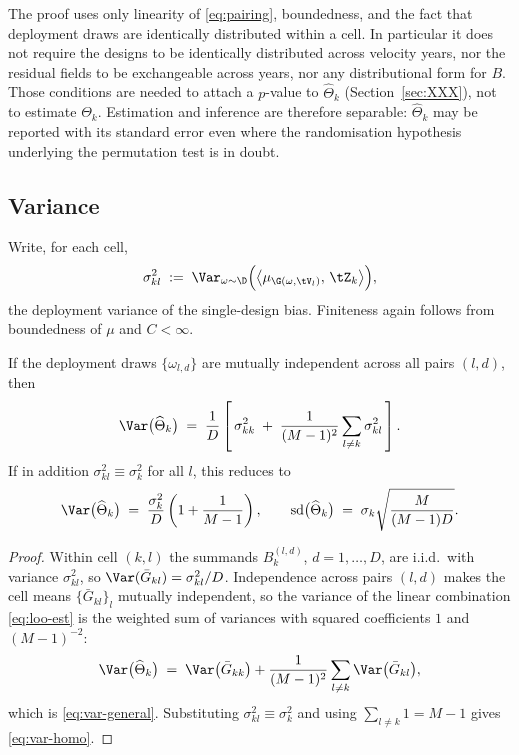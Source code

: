 \begin{remark}
\label{rem:noassumption}
The proof uses only linearity of \eqref{eq:pairing}, boundedness, and the fact that deployment
draws are identically distributed within a cell. In particular it does not require the designs to
be identically distributed across velocity years, nor the residual fields to be exchangeable across
years, nor any distributional form for $B$. Those conditions are needed to attach a $p$-value to
$\widehat{\Theta}_k$ (Section~\ref{sec:XXX}), not to estimate $\Theta_k$. Estimation and inference
are therefore separable: $\widehat{\Theta}_k$ may be reported with its standard error even where
the randomisation hypothesis underlying the permutation test is in doubt.
\end{remark}

\subsection{Variance}
\label{sec:loo-var}

Write, for each cell,
\begin{equation}
  \sigma^2_{kl} \;:=\; \Var_{\omega\sim\D}\Big(\big\langle \mu_{\G(\omega,\tV_l)},\, \tZ_k\big\rangle\Big) ,
\end{equation}
the deployment variance of the single-design bias. Finiteness again follows from boundedness of
$\mu$ and $C < \infty$.

\begin{proposition}
\label{prop:var}
If the deployment draws $\{\omega_{l,d}\}$ are mutually independent across all pairs $(l,d)$, then
\begin{equation}
  \label{eq:var-general}
  \Var\big(\widehat{\Theta}_k\big)
  \;=\; \frac{1}{D}\left[\, \sigma^2_{kk} \;+\; \frac{1}{(M-1)^2}\sum_{l \neq k} \sigma^2_{kl} \,\right] .
\end{equation}
If in addition $\sigma^2_{kl} \equiv \sigma^2_k$ for all $l$, this reduces to
\begin{equation}
  \label{eq:var-homo}
  \Var\big(\widehat{\Theta}_k\big) \;=\; \frac{\sigma_k^{2}}{D}\left(1 + \frac{1}{M-1}\right),
  \qquad
  \mathrm{sd}\big(\widehat{\Theta}_k\big) \;=\; \sigma_k\sqrt{\frac{M}{(M-1)D}} .
\end{equation}
\end{proposition}

\begin{proof}
Within cell $(k,l)$ the summands $B_k^{(l,d)}$, $d = 1,\dots,D$, are i.i.d.\ with variance
$\sigma^2_{kl}$, so $\Var(\bar{G}_{kl}) = \sigma^2_{kl}/D$. Independence across pairs $(l,d)$
makes the cell means $\{\bar{G}_{kl}\}_{l}$ mutually independent, so the variance of the linear
combination \eqref{eq:loo-est} is the weighted sum of variances with squared coefficients $1$ and
$(M-1)^{-2}$:
\begin{equation}
  \Var\big(\widehat{\Theta}_k\big)
  \;=\; \Var\big(\bar{G}_{kk}\big) + \frac{1}{(M-1)^2}\sum_{l\neq k}\Var\big(\bar{G}_{kl}\big) ,
\end{equation}
which is \eqref{eq:var-general}. Substituting $\sigma^2_{kl} \equiv \sigma^2_k$ and using
$\sum_{l\neq k} 1 = M-1$ gives \eqref{eq:var-homo}.
\end{proof}

